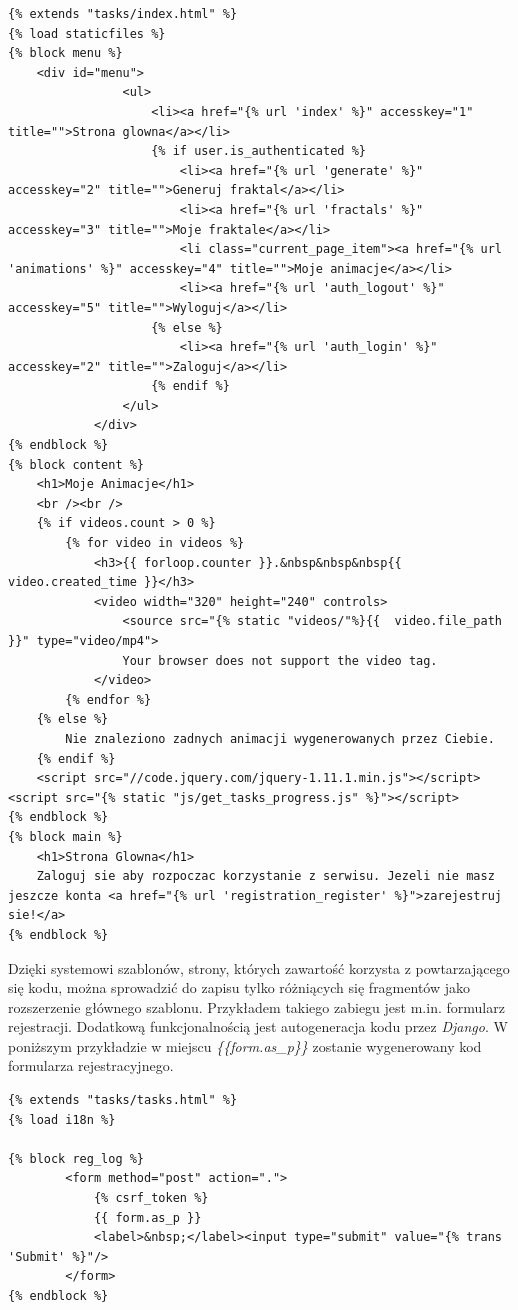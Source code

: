 \documentclass[a4paper]{article}
\begin{document}
\begin{lstlisting}
{% extends "tasks/index.html" %}
{% load staticfiles %}
{% block menu %}
    <div id="menu">
				<ul>
					<li><a href="{% url 'index' %}" accesskey="1" title="">Strona glowna</a></li>
                    {% if user.is_authenticated %}
					    <li><a href="{% url 'generate' %}" accesskey="2" title="">Generuj fraktal</a></li>
					    <li><a href="{% url 'fractals' %}" accesskey="3" title="">Moje fraktale</a></li>
					    <li class="current_page_item"><a href="{% url 'animations' %}" accesskey="4" title="">Moje animacje</a></li>
					    <li><a href="{% url 'auth_logout' %}" accesskey="5" title="">Wyloguj</a></li>
                    {% else %}
                        <li><a href="{% url 'auth_login' %}" accesskey="2" title="">Zaloguj</a></li>
                    {% endif %}
				</ul>
			</div>
{% endblock %}
{% block content %}
    <h1>Moje Animacje</h1>
    <br /><br />
    {% if videos.count > 0 %}
        {% for video in videos %}
            <h3>{{ forloop.counter }}.&nbsp&nbsp&nbsp{{ video.created_time }}</h3>
            <video width="320" height="240" controls>
                <source src="{% static "videos/"%}{{  video.file_path }}" type="video/mp4">
                Your browser does not support the video tag.
            </video>
        {% endfor %}
    {% else %}
        Nie znaleziono zadnych animacji wygenerowanych przez Ciebie.
    {% endif %}
    <script src="//code.jquery.com/jquery-1.11.1.min.js"></script>
<script src="{% static "js/get_tasks_progress.js" %}"></script>
{% endblock %}
{% block main %}
    <h1>Strona Glowna</h1>
    Zaloguj sie aby rozpoczac korzystanie z serwisu. Jezeli nie masz jeszcze konta <a href="{% url 'registration_register' %}">zarejestruj sie!</a>
{% endblock %}
\end{lstlisting}

Dzięki systemowi szablonów, strony, których zawartość korzysta z powtarzającego się kodu, można sprowadzić do zapisu tylko różniących się fragmentów jako rozszerzenie głównego szablonu. Przykładem takiego zabiegu jest m.in. formularz rejestracji. Dodatkową funkcjonalnością jest autogeneracja kodu przez \textit{Django}. W poniższym przykładzie w miejscu \textit{\{\{form.as\_p\}\}} zostanie wygenerowany kod formularza rejestracyjnego.

\begin{lstlisting}
{% extends "tasks/tasks.html" %}
{% load i18n %}

{% block reg_log %}
        <form method="post" action=".">
            {% csrf_token %}
            {{ form.as_p }}
            <label>&nbsp;</label><input type="submit" value="{% trans 'Submit' %}"/>
        </form>
{% endblock %}
\end{lstlisting}
\end{document}
